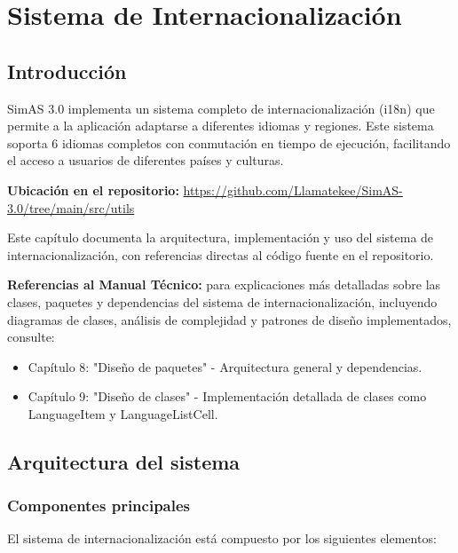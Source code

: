 \chapter{Sistema de Internacionalización}\label{cap-internacionalizacion}

\section{Introducción}

SimAS 3.0 implementa un sistema completo de internacionalización (i18n) que permite a la aplicación adaptarse a diferentes idiomas y regiones. Este sistema soporta 6 idiomas completos con conmutación en tiempo de ejecución, facilitando el acceso a usuarios de diferentes países y culturas.

\textbf{Ubicación en el repositorio:} \url{https://github.com/Llamatekee/SimAS-3.0/tree/main/src/utils}

Este capítulo documenta la arquitectura, implementación y uso del sistema de internacionalización, con referencias directas al código fuente en el repositorio.

\textbf{Referencias al Manual Técnico:} para explicaciones más detalladas sobre las clases, paquetes y dependencias del sistema de internacionalización, incluyendo diagramas de clases, análisis de complejidad y patrones de diseño implementados, consulte:
\begin{itemize}
    \item Capítulo 8: "Diseño de paquetes" - Arquitectura general y dependencias.
    \item Capítulo 9: "Diseño de clases" - Implementación detallada de clases como LanguageItem y LanguageListCell.
\end{itemize}

\section{Arquitectura del sistema}

\subsection{Componentes principales}

El sistema de internacionalización está compuesto por los siguientes elementos:

